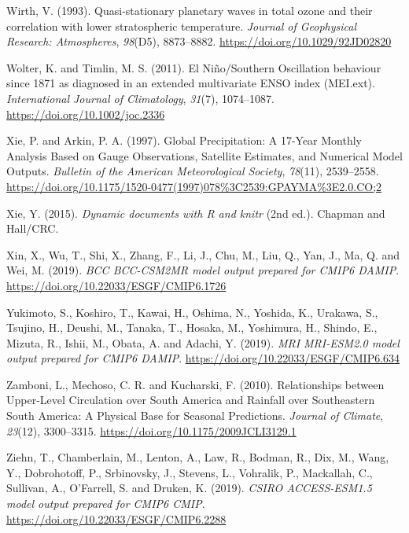 \documentclass[12pt,oneside,a4paper]{reedthesis}
\newlength{\cslhangindent}
\newenvironment{CSLReferences}[2] %
 {%
  \setlength{\parindent}{0pt}
  \ifodd #1 \everypar{\setlength{\hangindent}{\cslhangindent}}\ignorespaces\fi
  \ifnum #2 > 0
  \setlength{\parskip}{#2\baselineskip}
  \fi
 }%
 {}
\begin{document}
\begin{CSLReferences}{1}{0}
\leavevmode{}%
Wirth, V. (1993). Quasi-stationary planetary waves in total ozone and their correlation with lower stratospheric temperature. \emph{Journal of Geophysical Research: Atmospheres}, \emph{98}(D5), 8873--8882. \url{https://doi.org/10.1029/92JD02820}

\leavevmode{}%
Wolter, K. and Timlin, M. S. (2011). El {Ni{ñ}o}/{Southern Oscillation} behaviour since 1871 as diagnosed in an extended multivariate {ENSO} index ({MEI}.ext). \emph{International Journal of Climatology}, \emph{31}(7), 1074--1087. \url{https://doi.org/10.1002/joc.2336}

\leavevmode{}%
Xie, P. and Arkin, P. A. (1997). Global {Precipitation}: {A} 17-{Year Monthly Analysis Based} on {Gauge Observations}, {Satellite Estimates}, and {Numerical Model Outputs}. \emph{Bulletin of the American Meteorological Society}, \emph{78}(11), 2539--2558. \url{https://doi.org/10.1175/1520-0477(1997)078\%3C2539:GPAYMA\%3E2.0.CO;2}

\leavevmode{}%
Xie, Y. (2015). \emph{Dynamic documents with {R} and knitr} (2nd ed.). {Chapman and Hall/CRC}.

\leavevmode{}%
Xin, X., Wu, T., Shi, X., Zhang, F., Li, J., Chu, M., Liu, Q., Yan, J., Ma, Q. and Wei, M. (2019). \emph{BCC BCC-CSM2MR model output prepared for CMIP6 DAMIP}. \url{https://doi.org/10.22033/ESGF/CMIP6.1726}

\leavevmode{}%
Yukimoto, S., Koshiro, T., Kawai, H., Oshima, N., Yoshida, K., Urakawa, S., Tsujino, H., Deushi, M., Tanaka, T., Hosaka, M., Yoshimura, H., Shindo, E., Mizuta, R., Ishii, M., Obata, A. and Adachi, Y. (2019). \emph{MRI MRI-ESM2.0 model output prepared for CMIP6 DAMIP}. \url{https://doi.org/10.22033/ESGF/CMIP6.634}

\leavevmode{}%
Zamboni, L., Mechoso, C. R. and Kucharski, F. (2010). Relationships between {Upper-Level Circulation} over {South America} and {Rainfall} over {Southeastern South America}: {A Physical Base} for {Seasonal Predictions}. \emph{Journal of Climate}, \emph{23}(12), 3300--3315. \url{https://doi.org/10.1175/2009JCLI3129.1}

\leavevmode{}%
Ziehn, T., Chamberlain, M., Lenton, A., Law, R., Bodman, R., Dix, M., Wang, Y., Dobrohotoff, P., Srbinovsky, J., Stevens, L., Vohralik, P., Mackallah, C., Sullivan, A., O'Farrell, S. and Druken, K. (2019). \emph{CSIRO ACCESS-ESM1.5 model output prepared for CMIP6 CMIP}. \url{https://doi.org/10.22033/ESGF/CMIP6.2288}


\end{CSLReferences}
\end{document}
